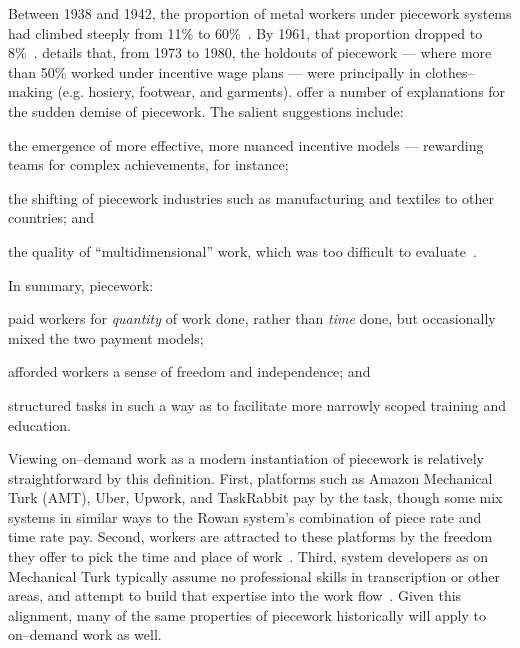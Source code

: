\documentclass[trackingWork]{subfiles}
\begin{document}
Between 1938 and 1942, the proportion of metal workers under piecework systems had climbed steeply from 11\% to 60\%~\cite{hart2005piecework}.
By 1961, that proportion dropped to 8\%~\cite{carlson1982time}.
\citeauthor{carlson1982time} details that, from 1973 to 1980, the holdouts of piecework
--- where more than 50\% worked under incentive wage plans ---
were principally in clothes--making (e.g. hosiery, footwear, and garments).
\citeauthor{hart2013rise} offer a number of explanations for the sudden demise of piecework.
The salient suggestions include:
\begin{inlinelist}
\item the emergence of more effective, more nuanced incentive models
--- rewarding teams for complex achievements, for instance;
\item the shifting of piecework industries such as manufacturing and textiles to other countries; and
\item the quality of ``multidimensional'' work, which was too difficult to evaluate~\cite{hart2013rise}.
\end{inlinelist}



In summary, piecework:
\begin{inlinelist}
  \item paid workers for \textit{quantity} of work done, rather than \textit{time} done,
        but occasionally mixed the two payment models;
  \item afforded workers a sense of freedom and independence; and
  \item structured tasks in such a way as to facilitate more narrowly scoped training and education.
\end{inlinelist}

Viewing on--demand work as a modern instantiation of piecework is relatively straightforward by this definition.
First, platforms such as Amazon Mechanical Turk (AMT), Uber, Upwork, and TaskRabbit pay by the task, though some mix systems in similar ways to the Rowan system's combination of piece rate and time rate pay.
Second, workers are attracted to these platforms by the freedom they offer to pick the time and place of work~\cite{martin2014being,whyWouldAnyoneBrewer}.
Third, system developers as on Mechanical Turk typically assume no professional skills in transcription or other areas, and attempt to build that expertise into the work flow~\cite{noronha2011platemate,bernsteinSoylent}.
Given this alignment, many of the same properties of piecework historically will apply to on--demand work as well. 
\end{document}
